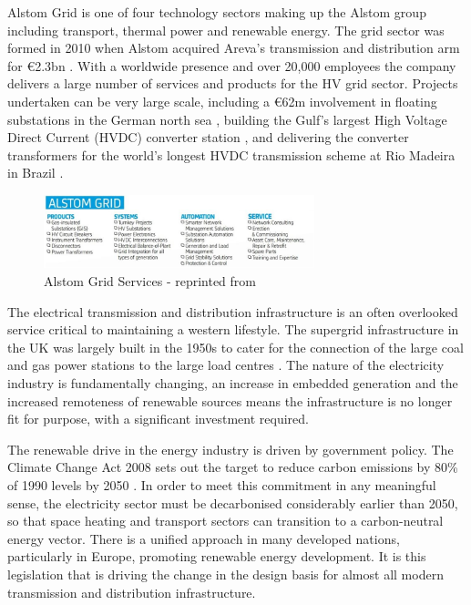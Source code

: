 {}
Alstom Grid is one of four technology sectors making up the Alstom group including transport, thermal power and renewable energy. 
The grid sector was formed in 2010 when Alstom acquired Areva's transmission and distribution arm \cite{AlstomGridInfo} for \euro2.3bn \cite{AlstomAreva}. 
With a worldwide presence and over 20,000 employees \cite{AlstomGridInfo} the company delivers a large number of services and products for the HV grid sector.
Projects undertaken can be very large scale, including a \euro62m involvement in floating substations in the German north sea \cite{AlstomGridInfo}, building the Gulf's largest High Voltage Direct Current (HVDC) converter station \cite{AlstomGulf}, and delivering the converter transformers for the world's longest HVDC transmission scheme at Rio Madeira in Brazil \cite{AlstomRio}.

\begin{figure}[!h]
\centering
\includegraphics[width = 0.7\textwidth]{Figures/AlstomGrid.jpg}
\caption{Alstom Grid Services - reprinted from \cite{AlstomGridInfo}}
\label{figure:AlstomGrid}
\end{figure}

The electrical transmission and distribution infrastructure is an often overlooked service critical to maintaining a western lifestyle.
The supergrid infrastructure in the UK was largely built in the 1950s to cater for the connection of the large coal and gas power stations to the large load centres \cite{NationalGrid75}.
The nature of the electricity industry is fundamentally changing, an increase in embedded generation and the increased remoteness of renewable sources means the infrastructure is no longer fit for purpose, with a significant investment required.

The renewable drive in the energy industry is driven by government policy.
The Climate Change Act 2008 sets out the target to reduce carbon emissions by 80\% of 1990 levels by 2050 \cite{ClimateChangeAct08}.
In order to meet this commitment in any meaningful sense, the electricity sector must be decarbonised considerably earlier than 2050, so that space heating and transport sectors can transition to a carbon-neutral energy vector.
There is a unified approach in many developed nations, particularly in Europe, promoting renewable energy development.
It is this legislation that is driving the change in the design basis for almost all modern transmission and distribution infrastructure.

